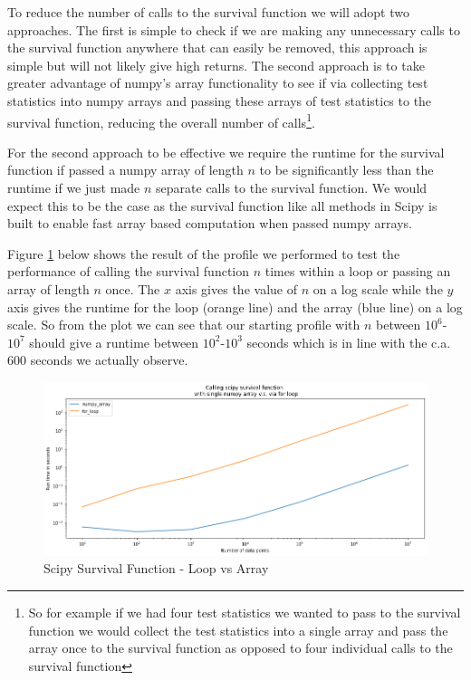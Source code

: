 To reduce the number of calls to the survival function we will adopt two approaches. The first is simple to check if we are making any unnecessary calls to the survival function anywhere that can easily be removed, this approach is simple but will not likely give high returns. The second approach is to take greater advantage of numpy's array functionality to see if via collecting test statistics into numpy arrays and passing these arrays of test statistics to the survival function, reducing the overall number of calls\footnote{So for example if we had four test statistics we wanted to pass to the survival function we would collect the test statistics into a single array and pass the array once to the survival function as opposed to four individual calls to the survival function}.

For the second approach to be effective we require the runtime for the survival function if passed a numpy array of length $n$ to be significantly less than the runtime if we just made $n$ separate calls to the survival function. We would expect this to be the case as the survival function like all methods in Scipy is built to enable fast array based computation when passed numpy arrays. 

Figure \ref{fig:loop_v_array} below shows the result of the profile we performed to test the performance of calling the survival function $n$ times within a loop or passing an array of length $n$ once. The $x$ axis gives the value of $n$ on a log scale while the $y$ axis gives the runtime for the loop (orange line) and the array (blue line) on a log scale. So from the plot we can see that our starting profile with $n$ between $10^6$-$10^7$ should give a runtime between $10^2$-$10^3$ seconds which is in line with the c.a. $600$ seconds we actually observe.

\begin{figure}[H]
\centering
\includegraphics[scale=0.5]{plots/scipy_profile.png}
\caption{Scipy Survival Function - Loop vs Array}
\label{fig:loop_v_array}
\end{figure} 

